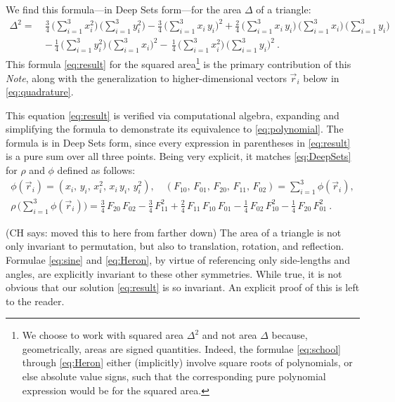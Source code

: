 \documentclass[10pt]{article}
\newcommand{\documentname}{\textsl{Note}}
\newcommand{\secbreak}{\bigskip{\centering\footnotesize $\triangle~~~\triangle~~~\triangle$\par}\bigskip\noindent}
\newcommand{\CH}[1]{{\color{blue} (CH says: #1)}}
\begin{document}
\secbreak
We find this formula---in Deep Sets form---for the area $\Delta$ of a triangle:
\begin{align}
    \Delta^2 = \ &
    \frac{3}{4} \, \big( \sum_{i=1}^{3} x_i^2 \big) \, \big( \sum_{i=1}^{3} y_i^2 \big)
    - \frac{3}{4} \, \big( \sum_{i=1}^{3} x_i \, y_i \big)^2 
    + \frac{2}{4} \, \big( \sum_{i=1}^{3} x_i \, y_i \big) \, \big( \sum_{i=1}^{3} x_i \big) \, \big( \sum_{i=1}^{3} y_i \big)
    \nonumber\\ &
    - \, \frac{1}{4} \, \big( \sum_{i=1}^{3} y_i^2 \big) \, \big( \sum_{i=1}^{3} x_i \big)^2
    - \, \frac{1}{4} \, \big( \sum_{i=1}^{3} x_i^2 \big) \, \big( \sum_{i=1}^{3} y_i \big)^2
     ~.
\label{eq:result}
\end{align}
This formula \eqref{eq:result} for the squared area\footnote{%
    We choose to work with squared area $\Delta^2$ and not area $\Delta$ because, geometrically, areas are signed quantities.
    Indeed, the formulae \eqref{eq:school} through \eqref{eq:Heron} either (implicitly) involve square roots of polynomials, or else absolute value signs, such that the corresponding pure polynomial expression would be for the squared area.}
is the primary contribution of this \documentname, along with the generalization to higher-dimensional vectors $\vec{r}_i$ below in \eqref{eq:quadrature}.

This equation \eqref{eq:result} is verified via computational algebra, expanding and simplifying the formula to demonstrate its equivalence to \eqref{eq:polynomial}.
The formula is in Deep Sets form, since
every expression in parentheses in \eqref{eq:result} is a pure sum over all three points.
Being very explicit, it matches \eqref{eq:DeepSets} for $\rho$ and $\phi$ defined as follows:
\begin{gather}
    \phi(\vec{r}_i) = (
        x_i, \,
        y_i, \,
        x_i^2, \,
        x_i \, y_i, \,
        y_i^2
    ), \quad
    (
        F_{10}, \,
        F_{01}, \,
        F_{20}, \,
        F_{11}, \,
        F_{02}
    ) = \sum_{i=1}^{3} \phi(\vec{r}_i),
    \\
    \rho \, \big( \sum_{i=1}^{3} \phi(\vec{r}_i) \big)
    = \frac{3}{4} \, F_{20} \, F_{02}
    - \frac{3}{4} \, F_{11}^2
    + \frac{2}{4} \, F_{11} \, F_{10} \, F_{01}
    - \frac{1}{4} \, F_{02} \, F_{10}^2
    - \frac{1}{4} \, F_{20} \, F_{01}^2~.
    \nonumber
\end{gather}

\CH{moved this to here from farther down}
The area of a triangle is not only invariant to permutation, but also to translation, rotation, and reflection.
Formulae \eqref{eq:sine} and \eqref{eq:Heron}, by virtue of referencing only side-lengths and angles, are explicitly invariant to these other symmetries.
While true, it is not obvious that our solution \eqref{eq:result} is so invariant.
An explicit proof of this is left to the reader.
\end{document}
